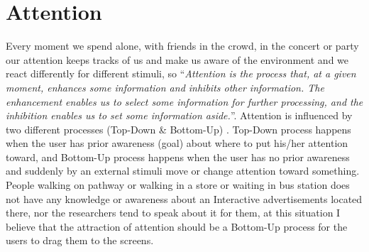 \section{Attention}



Every moment we spend alone, with friends in the crowd, in the concert or party our attention keeps tracks of us and make us aware of the environment and we react differently for different stimuli, so ``\emph{Attention is the process that, at a given moment, enhances some information and inhibits other information. The enhancement enables us to select some information for further processing, and the inhibition enables us to set some information aside.}''\cite{Attention}. Attention is influenced by two different processes (Top-Down \& Bottom-Up) \cite{attention1,Attention}. Top-Down process happens when the user has prior awareness (goal) about where to put his/her attention toward, and Bottom-Up process happens when the user has no prior awareness and suddenly by an external stimuli move or change attention toward something. People walking on pathway or walking in a store or waiting in bus station does not have any knowledge or awareness about an Interactive advertisements located there, nor the researchers tend to speak about it for them, at this situation I believe that the attraction of attention should be a Bottom-Up process for the users to drag them to the screens.

